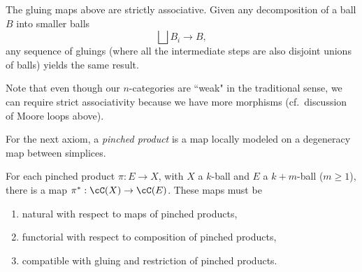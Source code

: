 \documentclass{pnastwo}
\begin{document}
\begin{article}
\begin{axiom} \label{nca-assoc}\label{axiom:associativity}
The gluing maps above are strictly associative.
Given any decomposition of a ball $B$ into smaller balls
$$\bigsqcup B_i \to B,$$ 
any sequence of gluings (where all the intermediate steps are also disjoint unions of balls) yields the same result.
\end{axiom}
Note that even though our $n$-categories are ``weak" in the traditional sense, we can require
strict associativity because we have more morphisms (cf.\ discussion of Moore loops above).

For the next axiom, a \emph{pinched product} is a map locally modeled on a degeneracy map between simplices.
\begin{axiom}
\label{axiom:product}
For each pinched product $\pi:E\to X$, with $X$ a $k$-ball and $E$ a $k{+}m$-ball ($m\ge 1$),
there is a map $\pi^*:\cC(X)\to \cC(E)$.
These maps must be
\begin{enumerate}
\item natural with respect to maps of pinched products,
\item functorial with respect to composition of pinched products, 
\item compatible with gluing and restriction of pinched products.
\end{enumerate}


\end{axiom}
\end{article}
\end{document}
